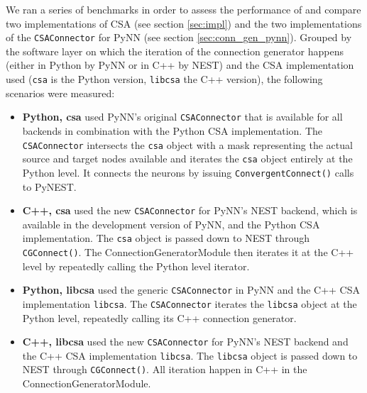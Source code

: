\documentclass{frontiersSCNS} %
\begin{document}
We ran a series of benchmarks in order to assess the performance of
and compare two implementations of CSA (see section \ref{sec:impl})
and the two implementations of the \verb|CSAConnector| for PyNN (see section
\ref{sec:conn_gen_pynn}). Grouped by the software layer on which the
iteration of the connection generator happens (either in Python by PyNN
or in C++ by NEST) and the CSA implementation used (\verb|csa| is the Python
version, \verb|libcsa| the C++ version), the following scenarios were
measured:

\begin{itemize}
\item \textbf{Python, csa} used PyNN's original \verb|CSAConnector|
  that is available for all backends in combination with the Python
  CSA implementation. The \verb|CSAConnector| intersects the
  \verb|csa| object with a mask representing the actual source and
  target nodes available and iterates the \verb|csa| object entirely
  at the Python level. It connects the neurons by issuing
  \verb|ConvergentConnect()| calls to PyNEST.
\item \textbf{C++, csa} used the new \verb|CSAConnector| for PyNN's NEST
  backend, which is available in the development version of PyNN, and the
  Python CSA implementation. The \verb|csa| object is passed down to NEST
  through \verb|CGConnect()|. The ConnectionGeneratorModule then
  iterates it at the C++ level by repeatedly calling the Python level
  iterator.
\item \textbf{Python, libcsa} used the generic \verb|CSAConnector| in
  PyNN and the C++ CSA implementation \verb|libcsa|. The
  \verb|CSAConnector| iterates the \verb|libcsa| object at the Python
  level, repeatedly calling its C++ connection generator.
\item \textbf{C++, libcsa} used the new \verb|CSAConnector| for PyNN's
  NEST backend and the C++ CSA implementation \verb|libcsa|. The
  \verb|libcsa| object is passed down to NEST through
  \verb|CGConnect()|. All iteration happen in C++ in the
  ConnectionGeneratorModule.
\end{itemize}
\end{document}
